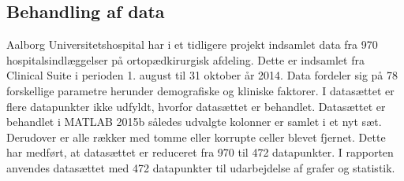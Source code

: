 \subsection*{Behandling af data}
Aalborg Universitetshospital har i et tidligere projekt indsamlet data fra 970 hospitalsindlæggelser på ortopædkirurgisk afdeling. Dette er indsamlet fra Clinical Suite i perioden 1. august til 31 oktober år 2014. Data fordeler sig på 78 forskellige parametre herunder demografiske og kliniske faktorer. I datasættet er flere datapunkter ikke udfyldt, hvorfor datasættet er behandlet. 
Datasættet er behandlet i MATLAB 2015b således udvalgte kolonner er samlet i et nyt sæt. Derudover er alle rækker med tomme eller korrupte celler blevet fjernet. Dette har medført, at datasættet er reduceret fra 970 til 472 datapunkter. I rapporten anvendes datasættet med 472 datapunkter til udarbejdelse af grafer og statistik. 
 




